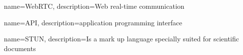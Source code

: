 \usepackage{glossaries}
\makeglossaries

{
    name=WebRTC,
    description={Web real-time communication}
}

{
    name=API,
    description={application programming interface}
}


{
    name=STUN,
    description={Is a mark up language specially suited 
    for scientific documents}
}